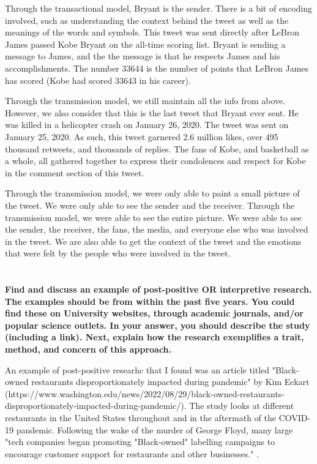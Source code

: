 \documentclass[a4paper]{article}
\begin{document}
        Through the transactional model, Bryant is the sender. There is a bit of encoding involved, such as understanding
        the context behind the tweet as well as the meanings of the words and symbols. This tweet was sent directly 
        after LeBron James passed Kobe Bryant on the all-time scoring list. Bryant is sending a message to James, and the
        the message is that he respects James and his accomplishments. The number 33644 is the number of points that 
        LeBron James has scored (Kobe had scored 33643 in his career). 

        Through the transmission model, we still maintain all the info from above. However, we also consider that this is 
        the last tweet that Bryant ever sent. He was killed in a helicopter crash on January 26, 2020. The tweet was sent
        on January 25, 2020. As such, this tweet garnered 2.6 million likes, over 495 thousand retweets, and 
        thousands of replies. The fans of Kobe, and basketball as a whole, all gathered together to express their 
        condolences and respect for Kobe in the comment section of this tweet. 

        Through the transmission model, we were only able to paint a small picture of the tweet. We were only able to see
        the sender and the receiver. Through the transmission model, we were able to see the entire picture. We were able
        to see the sender, the receiver, the fans, the media, and everyone else who was involved in the tweet. We are also 
        able to get the context of the tweet and the emotions that were felt by the people who were involved in the tweet.

    \section{}
        \textbf{Find and discuss an example of post-positive OR interpretive research. The examples should be from within the past five years. You could find these on University websites, through academic journals, and/or popular science outlets. In your answer, you should describe the study (including a link). Next, explain how the research exemplifies a trait, method, and concern of this approach.}
        
        An example of post-positive researhc that I found was an article titled "Black-owned restaurants disproportionately impacted during pandemic" by 
        Kim Eckart \cite{eckart2022} ({https://www.washington.edu/news/2022/08/29/black-owned-restaurants-disproportionately-impacted-during-pandemic/}). The study looks at different restaurants in the United States throughout and in 
        the aftermath of the COVID-19 pandemic. Following the wake of the murder of George Floyd, many large "tech companies 
        began promoting "Black-owned" labelling campaigns to encourage customer support for restaurants and other businesses." \cite{eckart2022}.
\end{document}
